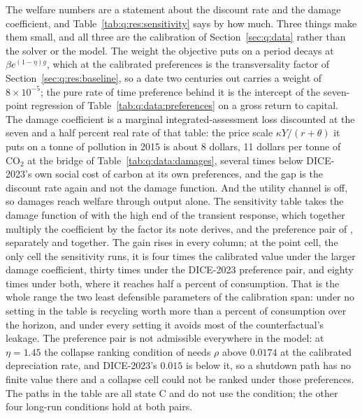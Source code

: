 The welfare numbers are a statement about the discount rate and the damage coefficient, and Table~\ref{tab:q:res:sensitivity} says by how much. Three things make them small, and all three are the calibration of Section~\ref{sec:q:data} rather than the solver or the model. The weight the objective puts on a period decays at $\beta e^{(1-\eta)g}$, which at the calibrated preferences is the transversality factor of Section~\ref{sec:q:res:baseline}, so a date two centuries out carries a weight of $8\times10^{-5}$; the pure rate of time preference behind it is the intercept of the seven-point regression of Table~\ref{tab:q:data:preferences} on a gross return to capital. The damage coefficient is a marginal integrated-assessment loss discounted at the seven and a half percent real rate of that table: the price scale $\kappa Y/(r+\theta)$ it puts on a tonne of pollution in 2015 is about 8 dollars, 11 dollars per tonne of CO$_2$ at the bridge of Table~\ref{tab:q:data:damages}, several times below DICE-2023's own social cost of carbon at its own preferences, and the gap is the discount rate again and not the damage function. And the utility channel is off, so damages reach welfare through output alone. The sensitivity table takes the damage function of \textcite{howard2017} with the high end of the transient response, which together multiply the coefficient by the factor its note derives, and the preference pair of \textcite{barrage2024}, separately and together. The gain rises in every column; at the point cell, the only cell the sensitivity runs, it is four times the calibrated value under the larger damage coefficient, thirty times under the DICE-2023 preference pair, and eighty times under both, where it reaches half a percent of consumption. That is the whole range the two least defensible parameters of the calibration span: under no setting in the table is recycling worth more than a percent of consumption over the horizon, and under every setting it avoids most of the counterfactual's leakage. The preference pair is not admissible everywhere in the model: at $\eta=1.45$ the collapse ranking condition of  needs $\rho$ above $0.0174$ at the calibrated depreciation rate, and DICE-2023's $0.015$ is below it, so a shutdown path has no finite value there and a collapse cell could not be ranked under those preferences. The paths in the table are all state C and do not use the condition; the other four long-run conditions hold at both pairs.



